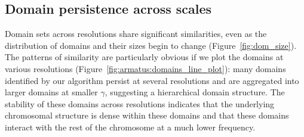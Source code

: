 \documentclass[12pt]{cmuthesis}
\begin{document}
  \subsection{Domain persistence across scales}

  Domain sets across resolutions share significant similarities, even as the distribution of domains and their sizes begin to change (Figure~\ref{fig:dom_size}). The patterns of similarity are particularly obvious if we plot the domains at various resolutions (Figure~\ref{fig:armatus:domains_line_plot}): many domains identified by our algorithm persist at several resolutions and are aggregated into larger domains at smaller $\gamma$, suggesting a hierarchical domain structure. The stability of these domains across resolutions indicates that the underlying chromosomal structure is dense within these domains and that these domains interact with the rest of the chromosome at a much lower frequency.
\end{document}
